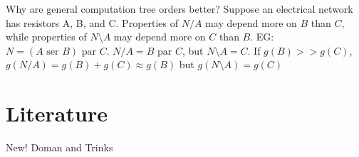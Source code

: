\documentclass{article}
\begin{document}
\begin{enumerate}
Why are general computation tree orders better?  Suppose an electrical network has resistors
A, B, and C.  Properties of $N/A$ may depend more on $B$ than $C$, while properties of
$N\setminus A$ may depend more on $C$ than $B$. EG: $N=(A \text{ ser } B) \text{ par } C$.
$N/A = B \text{ par } C$, but $N\setminus A = C$.  If $g(B) >> g(C)$, 
$g(N/A) = g(B) + g(C) \approx g(B)$
but $g(N\setminus A) = g(C)$ 



\section{Literature}

New! Doman and Trinks \cite{DohmenTrinksAbsWitBrok}

\end{enumerate}


\end{document}
